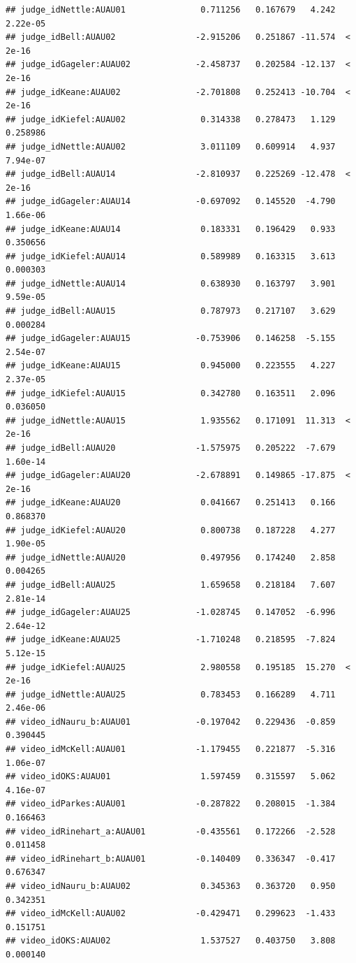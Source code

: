 \documentclass{monashthesis}
\begin{document}
\begin{verbatim}
## judge_idNettle:AUAU01               0.711256   0.167679   4.242 2.22e-05
## judge_idBell:AUAU02                -2.915206   0.251867 -11.574  < 2e-16
## judge_idGageler:AUAU02             -2.458737   0.202584 -12.137  < 2e-16
## judge_idKeane:AUAU02               -2.701808   0.252413 -10.704  < 2e-16
## judge_idKiefel:AUAU02               0.314338   0.278473   1.129 0.258986
## judge_idNettle:AUAU02               3.011109   0.609914   4.937 7.94e-07
## judge_idBell:AUAU14                -2.810937   0.225269 -12.478  < 2e-16
## judge_idGageler:AUAU14             -0.697092   0.145520  -4.790 1.66e-06
## judge_idKeane:AUAU14                0.183331   0.196429   0.933 0.350656
## judge_idKiefel:AUAU14               0.589989   0.163315   3.613 0.000303
## judge_idNettle:AUAU14               0.638930   0.163797   3.901 9.59e-05
## judge_idBell:AUAU15                 0.787973   0.217107   3.629 0.000284
## judge_idGageler:AUAU15             -0.753906   0.146258  -5.155 2.54e-07
## judge_idKeane:AUAU15                0.945000   0.223555   4.227 2.37e-05
## judge_idKiefel:AUAU15               0.342780   0.163511   2.096 0.036050
## judge_idNettle:AUAU15               1.935562   0.171091  11.313  < 2e-16
## judge_idBell:AUAU20                -1.575975   0.205222  -7.679 1.60e-14
## judge_idGageler:AUAU20             -2.678891   0.149865 -17.875  < 2e-16
## judge_idKeane:AUAU20                0.041667   0.251413   0.166 0.868370
## judge_idKiefel:AUAU20               0.800738   0.187228   4.277 1.90e-05
## judge_idNettle:AUAU20               0.497956   0.174240   2.858 0.004265
## judge_idBell:AUAU25                 1.659658   0.218184   7.607 2.81e-14
## judge_idGageler:AUAU25             -1.028745   0.147052  -6.996 2.64e-12
## judge_idKeane:AUAU25               -1.710248   0.218595  -7.824 5.12e-15
## judge_idKiefel:AUAU25               2.980558   0.195185  15.270  < 2e-16
## judge_idNettle:AUAU25               0.783453   0.166289   4.711 2.46e-06
## video_idNauru_b:AUAU01             -0.197042   0.229436  -0.859 0.390445
## video_idMcKell:AUAU01              -1.179455   0.221877  -5.316 1.06e-07
## video_idOKS:AUAU01                  1.597459   0.315597   5.062 4.16e-07
## video_idParkes:AUAU01              -0.287822   0.208015  -1.384 0.166463
## video_idRinehart_a:AUAU01          -0.435561   0.172266  -2.528 0.011458
## video_idRinehart_b:AUAU01          -0.140409   0.336347  -0.417 0.676347
## video_idNauru_b:AUAU02              0.345363   0.363720   0.950 0.342351
## video_idMcKell:AUAU02              -0.429471   0.299623  -1.433 0.151751
## video_idOKS:AUAU02                  1.537527   0.403750   3.808 0.000140

\end{verbatim}
\end{document}
